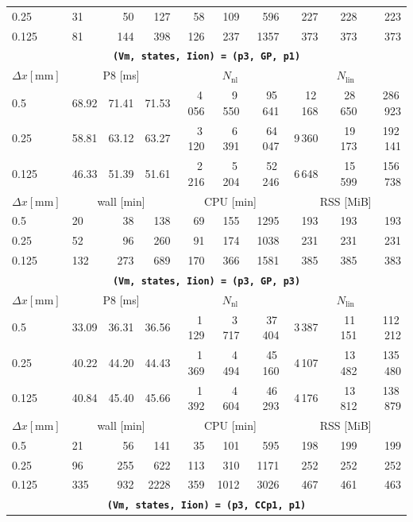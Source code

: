 \documentclass[11pt,a4paper]{article}
\newcommand{\code}[1]{\texttt{\small #1}}
\begin{document}
\begin{center}
\begin{longtable}{l|lrr|rrr|rrr}
0.25 & 31 & 50 & 127 & 58 & 109 & 596 & 227 & 228 & 223\\
0.125 & 81 & 144 & 398 & 126 & 237 & 1357 & 373 & 373 & 373\\
\hline
\hline
\multicolumn{10}{c}{\textbf{\code{(Vm, states, Iion) = (p3, GP, p1)}}}\\\hline
$ \Delta x [\text{mm}] $ & \multicolumn{3}{c|}{P8 [ms]} & \multicolumn{3}{c|}{$N_{\mathrm{nl}}$} & \multicolumn{3}{c|}{$N_{\mathrm{lin}}$}\\
0.5 & 68.92 & 71.41 & 71.53 & 4\,056 & 9\,550 & 95\,641 & 12\,168 & 28\,650 & 286\,923\\
0.25 & 58.81 & 63.12 & 63.27 & 3\,120 & 6\,391 & 64\,047 & 9\,360 & 19\,173 & 192\,141\\
0.125 & 46.33 & 51.39 & 51.61 & 2\,216 & 5\,204 & 52\,246 & 6\,648 & 15\,599 & 156\,738\\
\hline
$ \Delta x [\text{mm}] $ & \multicolumn{3}{c|}{wall [min]} & \multicolumn{3}{c|}{CPU [min]} & \multicolumn{3}{c|}{RSS [MiB]}\\
0.5 & 20 & 38 & 138 & 69 & 155 & 1295 & 193 & 193 & 193\\
0.25 & 52 & 96 & 260 & 91 & 174 & 1038 & 231 & 231 & 231\\
0.125 & 132 & 273 & 689 & 170 & 366 & 1581 & 385 & 385 & 383\\
\hline
\hline
\multicolumn{10}{c}{\textbf{\code{(Vm, states, Iion) = (p3, GP, p3)}}}\\\hline
$ \Delta x [\text{mm}] $ & \multicolumn{3}{c|}{P8 [ms]} & \multicolumn{3}{c|}{$N_{\mathrm{nl}}$} & \multicolumn{3}{c|}{$N_{\mathrm{lin}}$}\\
0.5 & 33.09 & 36.31 & 36.56 & 1\,129 & 3\,717 & 37\,404 & 3\,387 & 11\,151 & 112\,212\\
0.25 & 40.22 & 44.20 & 44.43 & 1\,369 & 4\,494 & 45\,160 & 4\,107 & 13\,482 & 135\,480\\
0.125 & 40.84 & 45.40 & 45.66 & 1\,392 & 4\,604 & 46\,293 & 4\,176 & 13\,812 & 138\,879\\
\hline
$ \Delta x [\text{mm}] $ & \multicolumn{3}{c|}{wall [min]} & \multicolumn{3}{c|}{CPU [min]} & \multicolumn{3}{c|}{RSS [MiB]}\\
0.5 & 21 & 56 & 141 & 35 & 101 & 595 & 198 & 199 & 199\\
0.25 & 96 & 255 & 622 & 113 & 310 & 1171 & 252 & 252 & 252\\
0.125 & 335 & 932 & 2228 & 359 & 1012 & 3026 & 467 & 461 & 463\\
\hline
\hline
\multicolumn{10}{c}{\textbf{\code{(Vm, states, Iion) = (p3, CCp1, p1)}}}\\\hline

\end{longtable}
\end{center}
\end{document}
